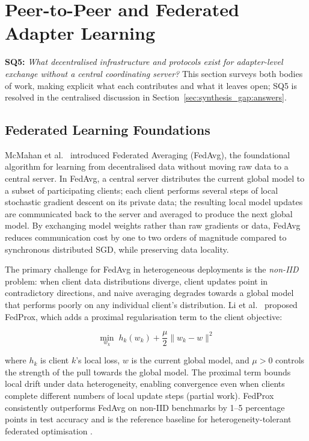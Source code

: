 \section{Peer-to-Peer and Federated Adapter Learning}
\label{sec:p2p_federated}

\noindent\textbf{SQ5:} \textit{What decentralised infrastructure and protocols
exist for adapter-level exchange without a central coordinating server?} This
section surveys both bodies of work, making explicit what each contributes
and what it leaves open; SQ5 is resolved in the centralised discussion in
Section~\ref{sec:synthesis_gap:answers}.

\subsection{Federated Learning Foundations}
\label{sec:p2p_federated:fl_foundations}

McMahan et al.~\cite{McMahan2017} introduced Federated Averaging (FedAvg), the foundational algorithm
for learning from decentralised data without moving raw data to a central server. In
FedAvg, a central server distributes the current global model to a subset of participating
clients; each client performs several steps of local stochastic gradient descent on its
private data; the resulting local model updates are communicated back to the server and
averaged to produce the next global model. By exchanging model weights rather than raw
gradients or data, FedAvg reduces communication cost by one to two orders of magnitude
compared to synchronous distributed SGD, while preserving data locality.

The primary challenge for FedAvg in heterogeneous deployments is the \textit{non-IID}
problem: when client data distributions diverge, client updates point in contradictory
directions, and naive averaging degrades towards a global model that performs poorly
on any individual client's distribution. Li et al.~\cite{Li2020FedProx} proposed FedProx, which
adds a proximal regularisation term to the client objective:

\begin{equation}
\min_{w_k} \; h_k(w_k) + \frac{\mu}{2} \|w_k - w\|^2
\label{eq:fedprox}
\end{equation}

where $h_k$ is client $k$'s local loss, $w$ is the current global model, and $\mu > 0$
controls the strength of the pull towards the global model. The proximal term bounds
local drift under data heterogeneity, enabling convergence even when clients complete
different numbers of local update steps (partial work). FedProx consistently outperforms
FedAvg on non-IID benchmarks by 1--5 percentage points in test accuracy and is the
reference baseline for heterogeneity-tolerant federated optimisation \cite{Li2020FedProx}.

